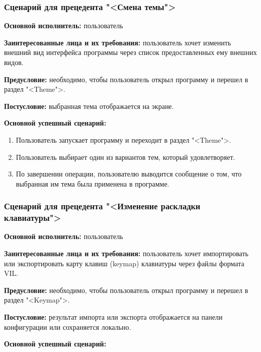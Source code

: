 \subsubsection{Сценарий для прецедента "<Смена темы">}

\textbf{Основной исполнитель:} пользователь

\textbf{Заинтересованные лица и их требования:} пользователь хочет изменить внешний вид интерфейса программы через список предоставленных ему внешних видов.

\textbf{Предусловие:} необходимо, чтобы пользователь открыл программу и перешел в раздел "<Theme">.

\textbf{Постусловие:} выбранная тема отображается на экране.

\textbf{Основной успешный сценарий:}

\begin{enumerate}
\item Пользователь запускает программу и переходит в раздел "<Theme">.
\item Пользователь выбирает один из вариантов тем, который удовлетворяет.
\item По завершении операции, пользователю выводится сообщение о том, что выбранная им тема была применена в программе.
\end{enumerate}

\subsubsection{Сценарий для прецедента "<Изменение раскладки клавиатуры">}

\textbf{Основной исполнитель:} пользователь

\textbf{Заинтересованные лица и их требования:} пользователь хочет импортировать или экспортировать карту клавиш (keymap) клавиатуры через файлы формата VIL.

\textbf{Предусловие:} необходимо, чтобы пользователь открыл программу и перешел в раздел "<Keymap">.

\textbf{Постусловие:} результат импорта или экспорта отображается на панели конфигурации или сохраняется локально.

\textbf{Основной успешный сценарий:}

